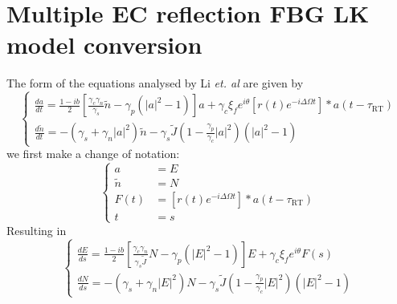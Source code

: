 \section{Multiple EC reflection FBG LK model conversion}
\label{sec:Li_chaos_nondim}
%
The form of the equations analysed by Li \textit{et. al} are given by
%
\begin{equation}
\left\{\begin{array}{l}
\displaystyle \frac{d a}{d t}=\frac{1-i b}{2}\left[\frac{\gamma_{c} \gamma_{n}}{\gamma_{s}} \tilde{n}-\gamma_{p}\left(|a|^{2}-1\right)\right] a+\gamma_{c} \xi_{f} e^{i \theta}\left[r(t) e^{-i \Delta \Omega t}\right] * a\left(t-\tau_\text{RT}\right) \\
\displaystyle \frac{d \tilde{n}}{d t}=-\left(\gamma_{s}+\gamma_{n}|a|^{2}\right) \tilde{n}-\gamma_{s} \tilde{J}\left(1-\frac{\gamma_{p}}{\gamma_{c}}|a|^{2}\right)\left(|a|^{2}-1\right)
\end{array}\right.
\end{equation}
%
we first make a change of notation:
%
\begin{equation*}
\left\{\begin{aligned}
a & =E \\
\tilde{n} & =N \\
F(t) & =\left[r(t) e^{-i \Delta \Omega t}\right] * a\left(t-\tau_\text{RT}\right) \\
t & =s
\end{aligned}\right.
\end{equation*}
%
Resulting in
%
\begin{equation*}
\left\{\begin{array}{l}
\displaystyle \frac{d E}{d s}=\frac{1-ib}{2}\left[\frac{\gamma_{c} \gamma_{n}}{\gamma_{s} \tilde{J}} N-\gamma_{p}\left(|E|^{2}-1\right)\right] E+\gamma_{c} \xi_{f} e^{i\theta} F(s) \\
\displaystyle \frac{d N}{d s}=-\left(\gamma_{s}+\gamma_{n}|E|^{2}\right) N-\gamma_{s} \tilde{J}\left(1-\frac{\gamma_{p}}{\gamma_{c}}|E|^{2}\right)\left(|E|^{2}-1\right)
\end{array}\right.
\end{equation*}
%
